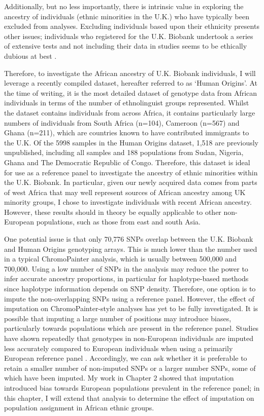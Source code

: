 Additionally, but no less importantly, there is intrinsic value in exploring the ancestry of individuals (ethnic minorities in the U.K.) who have typically been excluded from analyses. Excluding individuals based upon their ethnicity presents other issues; individuals who registered for the U.K. Biobank undertook a series of extensive tests and not including their data in studies seems to be ethically dubious at best \cite{peterson2019genome}.


Therefore, to investigate the African ancestry of U.K. Biobank individuals, I will leverage a recently compiled dataset, hereafter referred to as `Human Origins'. At the time of writing, it is the most detailed dataset of genotype data from African individuals in terms of the number of ethnolinguist groups represented. Whilst the dataset contains individuals from across Africa, it contains particularly large numbers of individuals from South Africa (n=104), Cameroon (n=567) and Ghana (n=211), which are countries known to have contributed immigrants to the U.K. Of the 5998 samples in the Human Origins dataset, 1,518 are previously unpublished, including all samples and 188 populations from Sudan, Nigeria, Ghana and The Democratic Republic of Congo. Therefore, this dataset is ideal for use as a reference panel to investigate the ancestry of ethnic minorities within the U.K. Biobank. In particular, given our newly acquired data comes from parts of west Africa that may well represent sources of African ancestry among UK minority groups, I chose to investigate individuals with recent African ancestry. However, these results should in theory be equally applicable to other non-European populations, such as those from east and south Asia. 

One potential issue is that only 70,776 SNPs overlap between the U.K. Biobank and Human Origins genotyping arrays. This is much lower than the number used in a typical ChromoPainter analysis, which is usually between 500,000 and 700,000. Using a low number of SNPs in the analysis may reduce the power to infer accurate ancestry proportions, in particular for haplotype-based methods since haplotype information depends on SNP density. Therefore, one option is to impute the non-overlapping SNPs using a reference panel. However, the effect of imputation on ChromoPainter-style analyses has yet to be fully investigated. It is possible that imputing a large number of positions may introduce biases, particularly towards populations which are present in the reference panel. Studies have shown repeatedly that genotypes in non-European individuals are imputed less accurately compared to European individuals when using a primarily European reference panel \cite{delaneau2018integrative, taliun2021sequencing}. Accordingly, we can ask whether it is preferable to retain a smaller number of non-imputed SNPs or a larger number SNPs, some of which have been imputed. My work in Chapter 2 showed that imputation introduced bias towards European populations prevalent in the reference panel; in this chapter, I will extend that analysis to determine the effect of imputation on population assignment in African ethnic groups. 

